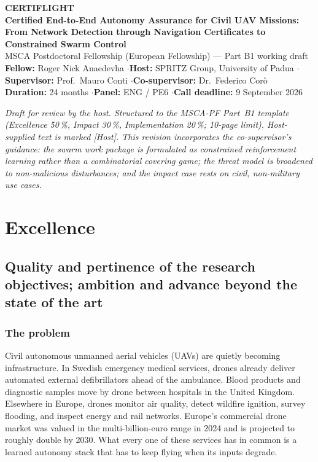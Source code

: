 \documentclass[11pt,a4paper]{article}
\begin{document}
\begin{center}
{\large\bfseries\color{DeepBlue} CERTIFLIGHT}\\[0.15em]
{\bfseries\color{AccentBlue} Certified End-to-End Autonomy Assurance for Civil UAV Missions:\\
From Network Detection through Navigation Certificates to Constrained Swarm Control}\\[0.35em]
{\footnotesize MSCA Postdoctoral Fellowship (European Fellowship) --- Part B1 working draft\\
\textbf{Fellow:} Roger Nick Anaedevha \quad$\cdot$\quad \textbf{Host:} SPRITZ Group, University of Padua \quad$\cdot$\quad
\textbf{Supervisor:} Prof.\ Mauro Conti \quad$\cdot$\quad \textbf{Co-supervisor:} Dr.\ Federico Cor\`o\\
\textbf{Duration:} 24 months \quad$\cdot$\quad \textbf{Panel:} ENG / PE6 \quad$\cdot$\quad \textbf{Call deadline:} 9 September 2026}
\end{center}

\vspace{-0.2em}
{\footnotesize\itshape Draft for review by the host. Structured to the MSCA-PF Part~B1 template (Excellence 50\,\%, Impact 30\,\%, Implementation 20\,\%; 10-page limit). Host-supplied text is marked [Host]. This revision incorporates the co-supervisor's guidance: the swarm work package is formulated as \emph{constrained reinforcement learning} rather than a combinatorial covering game; the threat model is broadened to non-malicious disturbances; and the impact case rests on civil, non-military use cases.}

\section{Excellence}

\subsection{Quality and pertinence of the research objectives; ambition and advance beyond the state of the art}

\subsubsection{The problem}
Civil autonomous unmanned aerial vehicles (UAVs) are quietly becoming infrastructure. In Swedish emergency medical services, drones already deliver automated external defibrillators ahead of the ambulance. Blood products and diagnostic samples move by drone between hospitals in the United Kingdom. Elsewhere in Europe, drones monitor air quality, detect wildfire ignition, survey flooding, and inspect energy and rail networks. Europe's commercial drone market was valued in the multi-billion-euro range in 2024 and is projected to roughly double by 2030. What every one of these services has in common is a learned autonomy stack that has to keep flying when its inputs degrade.
\end{document}

